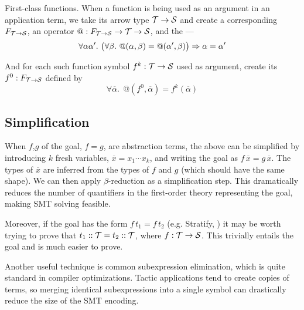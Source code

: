 \begin{paragraph}{First-class functions.}
When a function is being used as an argument in an application term, 
we take its arrow type $\mathcal{T}\to\mathcal{S}$ and create a corresponding  $F_{\mathcal{T}\to\mathcal{S}}$,
an operator $@ : F_{\mathcal{T}\to\mathcal{S}}\to\mathcal{T}\to\mathcal{S}$, and the  ---
\begin{equation}
\forall \alpha\alpha'.~ \big(\forall\beta.~ @(\alpha,\beta)=@(\alpha',\beta)\big)\Rightarrow \alpha=\alpha'
\label{automated:extensionality}
\end{equation}

And for each such function symbol $f^k:\mathcal{T}\to\mathcal{S}$ used as argument, create its 
 $f^0:F_{\mathcal{T}\to\mathcal{S}}$ defined by
\begin{equation}
\forall \overline\alpha.~~@(f^0,\overline\alpha)=f^k(\overline\alpha)
\label{automated:reflection}
\end{equation}
\end{paragraph}

\subsection{Simplification}

When $f$,$g$ of the goal, $f=g$, are abstraction terms, the above can be simplified by
introducing $k$ fresh variables, $\overline x=x_1\cdots x_k$, and writing the goal as
$f\,\overline x = g\,\overline x$. The types of $\overline x$ are inferred from the types
of $f$ and $g$ (which should have the same shape). We can then apply $\beta$-reduction as
a simplification step. This dramatically reduces the number of quantifiers in the first-order
theory representing the goal, making SMT solving feasible.

Moreover, if the goal has the form $f\,t_1 = f\,t_2$ (e.g. {\sf Stratify}, ) it may
be worth trying to prove that $t_1::\mathcal{T} = t_2::\mathcal{T}$, where $f:\mathcal{T}\to\mathcal{S}$.
This trivially entails the goal and is much easier to prove. 

Another useful technique is common subexpression elimination, which is quite standard
in compiler optimizations. Tactic applications tend to create copies of terms, so
merging identical subexpressions into a single symbol can drastically reduce the size
of the SMT encoding.
